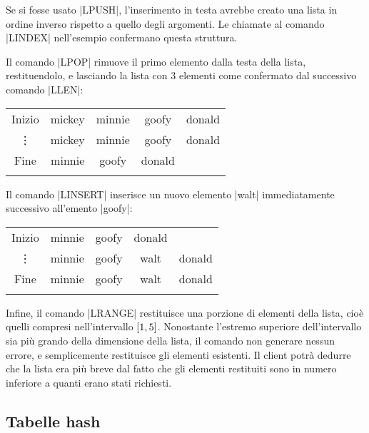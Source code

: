 Se si fosse usato \cverb|LPUSH|, l'inserimento in testa avrebbe creato una lista in ordine inverso
rispetto a quello degli argomenti. Le chiamate al comando \cverb|LINDEX| nell'esempio confermano
questa struttura.

Il comando \cverb|LPOP|  rimuove il primo elemento dalla testa della lista, restituendolo,
e lasciando la lista con 3 elementi come confermato dal successivo comando \cverb|LLEN|:

\begin{center}
	\begin{tabular}{c|*{4}{c|}}
	  \hhline{~----}
	  \scriptsize Inizio & mickey & minnie & goofy & donald \\ 
	  \hhline{~----}
	  \vdots             & \cellcolor{red!35}mickey & minnie & goofy & donald \\ 
	  \hhline{~----}
	  \scriptsize Fine   & minnie & goofy & donald \\ 
	  \hhline{~---}
	\end{tabular}
\end{center}

Il comando \cverb|LINSERT|  inserisce un nuovo elemento \cverb|walt| immediatamente
successivo all'emento \cverb|goofy|:

\begin{center}
	\begin{tabular}{c|*{4}{c|}}
	  \hhline{~---}
	  \scriptsize Inizio & minnie & goofy & donald \\ 
	  \hhline{~----}
	  \vdots             & minnie & goofy & \cellcolor{blue!25}walt & donald \\ 
	  \hhline{~----}
	  \scriptsize Fine   & minnie & goofy & walt & donald \\ 
	  \hhline{~----}
	\end{tabular}
\end{center}

Infine, il comando \cverb|LRANGE|  restituisce una porzione di elementi della lista, cioè
quelli compresi nell'intervallo $\interval{1}{5}$. Nonostante l'estremo superiore dell'intervallo
sia più grando della dimensione della lista, il comando non generare nessun errore, e semplicemente
restituisce gli elementi esistenti. Il client potrà dedurre che la lista era più breve dal fatto
che gli elementi restituiti sono in numero inferiore a quanti erano stati richiesti.

\subsection{Tabelle hash}

